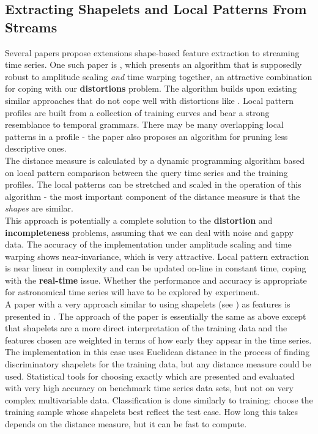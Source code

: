 	\subsection{Extracting Shapelets and Local Patterns From Streams}
	Several papers propose extensions shape-based feature extraction to streaming time series. One such paper is \citep{chen2007spade}, which presents an algorithm that is supposedly robust to amplitude scaling \emph{and} time warping together, an attractive combination for coping with our \textbf{distortions} problem. The algorithm builds upon existing similar approaches that do not cope well with distortions like \citep{wu2004online}. Local pattern profiles are built from a collection of training curves and bear a strong resemblance to temporal grammars. There may be many overlapping local patterns in a profile - the paper also proposes an algorithm for pruning less descriptive ones.
	\\
	The distance measure is calculated by a dynamic programming algorithm based on local pattern comparison between the query time series and the training profiles. The local patterns can be stretched and scaled in the operation of this algorithm - the most important component of the distance measure is that the \emph{shapes} are similar.
	\\
	This approach is potentially a complete solution to the \textbf{distortion} and \textbf{incompleteness} problems, assuming that we can deal with noise and gappy data. The accuracy of the implementation under amplitude scaling and time warping shows near-invariance, which is very attractive. Local pattern extraction is near linear in complexity and can be updated on-line in constant time, coping with the \textbf{real-time} issue. Whether the performance and accuracy is appropriate for astronomical time series will have to be explored by experiment. 	
	\\
	A paper with a very approach similar to \citep{chen2007spade} using shapelets (see \citep{ye2009time}) as features is presented in \citep{xing2011extracting}. The approach of the paper is essentially the same as above except that shapelets are a more direct interpretation of the training data and the features chosen are weighted in terms of how early they appear in the time series. 
	\\
	The implementation in this case uses Euclidean distance in the process of finding discriminatory shapelets for the training data, but any distance measure could be used. Statistical tools for choosing exactly which are presented and evaluated with very high accuracy on benchmark time series data sets, but not on very complex multivariable data. Classification is done similarly to training: choose the training sample whose shapelets best reflect the test case. How long this takes depends on the distance measure, but it can be fast to compute.
	
